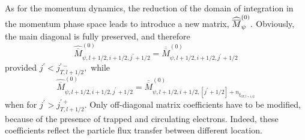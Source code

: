 As for the momentum dynamics, the reduction of the domain of integration in
the momentum phase space leads to introduce a new matrix, $\widehat{%
\overline{M}}_{\psi }^{\left( 0\right) }.$ Obviously, the main diagonal is
fully preserved, and therefore
\begin{equation}
\widehat{\overline{M}}_{\psi ,l+1/2,i+1/2,j^{\prime }+1/2}^{\left( 0\right)
}=\overline{\overline{M}}_{\psi ,l+1/2,i+1/2,j^{\prime }+1/2}^{\left(
0\right) }
\end{equation}
provided $j^{\prime }<j_{T,l+1/2}^{\prime -},$ while
\begin{equation}
\widehat{\overline{M}}_{\psi ,l+1/2,i+1/2,j^{\prime }+1/2}^{\left( 0\right)
}=\overline{\overline{M}}_{\psi ,l+1/2,i+1/2,\left[ j^{\prime }+1/2\right]
+n_{\xi _{0T,l+1/2}}}^{\left( 0\right) }
\end{equation}
when for $j^{\prime }>j_{T,l+1/2}^{\prime +}.$ Only off-diagonal matrix
coefficients have to be modified, because of the presence of trapped and
circulating electrons. Indeed, these coefficients reflect the particle flux
transfer between different location.

